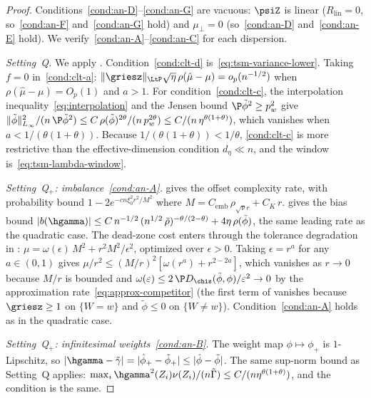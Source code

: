 \documentclass{article}
\begin{document}
\begin{proof}
Conditions~\ref{cond:an-D}--\ref{cond:an-G} are vacuous:
$\psiZ$ is linear
($R_{\mathrm{lin}} = 0$, so~\ref{cond:an-F} and~\ref{cond:an-G} hold)
and $\mu_\perp = 0$
(so~\ref{cond:an-D} and~\ref{cond:an-E} hold).
We verify~\ref{cond:an-A}--\ref{cond:an-C}
for each dispersion.

\emph{Setting~Q.}
We apply .
Condition~\ref{cond:clt-d} is~\eqref{eq:tsm-variance-lower}.
Taking $f = 0$ in~\ref{cond:clt-a}:
$\|\griesz\|_{\LtP}\sqrt{\eta}\,\rho(\hat\mu-\mu)
  = o_p(n^{-1/2})$
when $\rho(\hat\mu - \mu) = O_p(1)$
and $a > 1$.
For condition~\ref{cond:clt-c},
the interpolation inequality~\eqref{eq:interpolation}
and the Jensen bound $\P\tilde\phi^2 \ge p_w^2$
give
$\|\tilde\phi\|_{L_\infty}^2
  / (n\,\P\tilde\phi^2)
  \le C\,\rho(\tilde\phi)^{2\theta}
      / (n\, p_w^{2\theta})
  \le C / (n\,\eta^{\theta(1+\theta)})$,
which vanishes when $a < 1/(\theta(1+\theta))$.
Because $1/(\theta(1+\theta)) < 1/\theta$,
\ref{cond:clt-c} is more restrictive
than the effective-dimension condition $d_\eta \ll n$,
and the window is~\eqref{eq:tsm-lambda-window}.

\emph{Setting~Q$_+$: imbalance~\ref{cond:an-A}.}
gives the offset complexity rate,
with probability bound
$1 - 2e^{-cn\xi_0^2 r^2/M^2}$
where $M = C_{\mathrm{emb}}\,\rho_{\sqrt{\nu}r} + C_K\, r$.
gives the bias bound
$|b(\hgamma)|
  \le C\, n^{-1/2}\, (n^{1/2}\, \tilde\rho)^{-\theta/(2-\theta)}
  + 4\eta\,\rho(\tilde\phi)$,
the same leading rate as the quadratic case.
The dead-zone cost enters through
the tolerance degradation
in :
$\mu = \omega(\epsilon)\, M^2 + r^2 M^2/\epsilon^2$,
optimized over $\epsilon > 0$.
Taking $\epsilon = r^a$ for any $a \in (0,1)$
gives $\mu/r^2 \le (M/r)^2[\omega(r^a) + r^{2-2a}]$,
which vanishes as $r \to 0$
because $M/r$ is bounded
and $\omega(\varepsilon)
  \le 2\,\P D_{\chis}(\tilde\phi, \phi)/\varepsilon^2 \to 0$
by the approximation rate~\eqref{eq:approx-competitor}
(the first term of 
vanishes because $\griesz \ge 1$ on $\{W = w\}$
and $\tilde\phi \le 0$ on $\{W \ne w\}$).
Condition~\ref{cond:an-A} holds as in the quadratic case.

\emph{Setting~Q$_+$: infinitesimal weights~\ref{cond:an-B}.}
The weight map $\phi \mapsto \phi_+$
is $1$-Lipschitz,
so $|\hgamma - \tilde\gamma|
  = |\hat\phi_+ - \tilde\phi_+|
  \le |\hat\phi - \tilde\phi|$.
The same sup-norm bound as Setting~Q applies:
$\max_i \hgamma^2(Z_i)\nu(Z_i)/(n\hat\Gamma)
  \le C/(n\eta^{\theta(1+\theta)})$,
and the condition is the same.


\end{proof}
\end{document}
